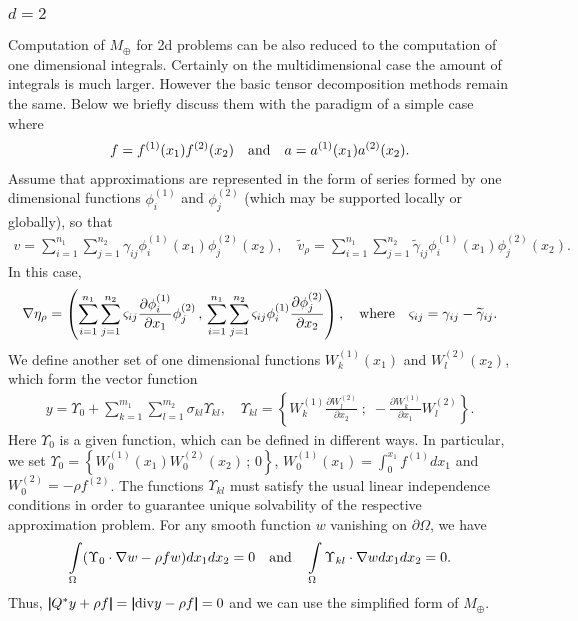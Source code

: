 \documentclass[amstex,amstext,amsfonts,epsf,12pt] {amsart}
\newcommand\be{\begin{eqnarray*}}
\newcommand\ee{\end{eqnarray*}}
\newcommand\ben{\begin{eqnarray}}
\newcommand\een{\end{eqnarray}}
\def\be{\begin{eqnarray*}}
\def\ee{\end{eqnarray*}}
\def\ben{\begin{eqnarray}}
\def\een{\end{eqnarray}}
\def\IntO{\int\limits_\Omega}
\def\NNN {{\boldsymbol{ |}\!\!|}}
\def\wt{\widetilde}
\def\dvg{{\rm div}}
\def\phix{\phi^{(1)}}
\def\phiy{\phi^{(2)}}
\def\Wx{W^{(1)}}
\def\Wy{W^{(2)}}
\def\fx{f^{(1)}}
\def\fy{f^{(2)}}
\def\ax{a^{(1)}}
\def\ay{a^{(2)}}
\begin{document}

\subsubsection{$d=2$}
Computation of $M_\oplus$ for 2d problems can be also
reduced to the computation of one dimensional integrals.
Certainly on the multidimensional case the amount of 
integrals is much larger. However the basic tensor decomposition methods remain the same. 
Below we briefly discuss them with the paradigm of a simple case where
 \be
 f=\fx(x_1)\fy(x_2)\quad{\rm  and} \quad
 a=\ax(x_1)\ay(x_2).
 \ee
  Assume that approximations
are represented in the form of series formed by one dimensional
functions $\phix_{i}$ and $\phiy_{j}$ (which may be supported locally or globally), so that
\be
v=\sum\limits^{n_1}_{i=1}\sum\limits^{n_2}_{j=1} \gamma_{i j}\phix_{i}(x_1)\phiy_{j}(x_2),\quad
\wt v_\rho=\sum\limits^{n_1}_{i=1}\sum\limits^{n_2}_{j=1} \wt\gamma_{i j}\phix_{i}(x_1)\phiy_{j}(x_2).
\ee
In this case,
\be
\nabla \eta_\rho=\left( \sum\limits^{n_1}_{i=1}\sum\limits^{n_2}_{j=1}
 \varsigma_{ij}\frac{\partial\phix_{i}}{\partial x_1}\phiy_{j}  \, ,\,
 \sum\limits^{n_1}_{i=1}\sum\limits^{n_2}_{j=1}\varsigma_{ij} 
 \phix_{i}\frac{\partial\phiy_{j}}{\partial x_2}   \right),
 \quad{\rm where}\quad \varsigma_{ij}=\gamma_{ij}-\wt \gamma_{ij}.
\ee
We define another set of one dimensional functions
$\Wx_{k}(x_1)$ and $\Wy_{l}(x_2)$, which form the vector function
\ben
\label{4.9}
y=\Upsilon_0+\sum\limits^{m_1}_{k=1}
\sum\limits^{m_2}_{l=1}\sigma_{kl}\Upsilon_{kl},\quad
\Upsilon_{kl}=\left\{ \Wx_{k} \frac{\partial\Wy_{l}}{\partial x_2} \; ;\;-\frac{\partial\Wx_{k}}{\partial x_1}\Wy_{l}   \right\}.
\een
Here $\Upsilon_0$ is a given function,
which can be defined in different ways. In particular,
we set $\Upsilon_0=\left\{\Wx_0(x_1)\Wy_0(x_2)\,;\,0\right\}$,
$\Wx_0(x_1)=\int^{x_1}_0\fx dx_1$
and $\Wy_0=-\rho\fy$. The functions $\Upsilon_{kl}$
must satisfy the usual linear independence conditions in order to guarantee
unique solvability of the respective approximation problem.
For any smooth function $w$ vanishing on $\partial\Omega$, we
have
\be
\IntO (\Upsilon_0\cdot \nabla w-\rho fw) dx_1dx_2=0\quad
{\rm and}\quad
\IntO \Upsilon_{kl}\cdot \nabla w dx_1dx_2=0.
\ee
Thus,
$\NNN Q^*y+\rho f\NNN=\NNN\dvg y-\rho f\NNN=0$ and we can use the simplified
form of $M_\oplus$.
\end{document}
